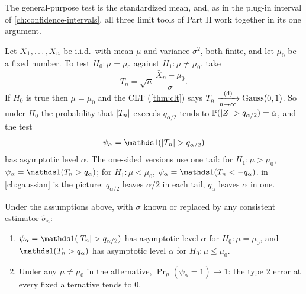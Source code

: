 The general-purpose test is the standardized mean, and, as in the plug-in interval of \cref{ch:confidence-intervals}, all three limit tools of Part II work together in its one argument.

Let $X_1, \ldots, X_n$ be i.i.d.\ with mean $\mu$ and variance $\sigma^2$, both finite, and let $\mu_0$ be a fixed number.
To test $H_0: \mu = \mu_0$ against $H_1: \mu \neq \mu_0$, take
\[
T_n = \sqrt{n}\, \frac{\bar{X}_n - \mu_0}{\sigma}.
\]
If $H_0$ is true then $\mu = \mu_0$ and the CLT (\cref{thm:clt}) says $T_n \xrightarrow [n \to \infty ]{\text{(d)}} \text{Gauss}(0, 1)$.
So under $H_0$ the probability that $\lvert T_n\rvert$ exceeds $q_{\alpha/2}$ tends to $\mathbb{P}(\lvert Z\rvert > q_{\alpha/2}) = \alpha$, and the test
\[
\psi_\alpha = \ind( \abs{T_n} > q_{\alpha/2} )
\]
has asymptotic level $\alpha$.
The one-sided versions use one tail: for $H_1: \mu > \mu_0$, $\psi_\alpha = \ind(T_n > q_\alpha)$; for $H_1: \mu < \mu_0$, $\psi_\alpha = \ind(T_n < -q_\alpha)$.
 in \cref{ch:gaussian} is the picture: $q_{\alpha/2}$ leaves $\alpha/2$ in each tail, $q_\alpha$ leaves $\alpha$ in one.

\begin{proposition}
\label{prop:clt-test}
Under the assumptions above, with $\sigma$ known or replaced by any consistent estimator $\hat{\sigma}_n$:
\begin{enumerate}[nosep]
\item $\psi_\alpha = \ind(\abs{T_n} > q_{\alpha/2})$ has asymptotic level $\alpha$ for $H_0: \mu = \mu_0$, and $\ind(T_n > q_\alpha)$ has asymptotic level $\alpha$ for $H_0: \mu \leq \mu_0$.
\item Under any $\mu \neq \mu_0$ in the alternative, $\Pr_\mu(\psi_\alpha = 1) \to 1$: the type 2 error at every fixed alternative tends to $0$.
\end{enumerate}
\end{proposition}

